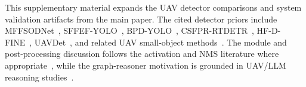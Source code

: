 % 
%
\providecommand{\FloatBarrier}{}

This supplementary material expands the UAV detector comparisons and system
validation artifacts from the main paper. The cited detector priors include
MFFSODNet~\cite{jiang2024mffsodnet}, SFFEF-YOLO~\cite{bai2025sffefyolo},
BPD-YOLO~\cite{chao2025bpdyolo}, CSFPR-RTDETR~\cite{hu2025csfprrtdetr},
HF-D-FINE~\cite{hu2026hfdifine}, UAVDet~\cite{yang2026uavdet}, and related
UAV small-object methods~\cite{han2025lrds,xie2026dgtsod,wang2026d2adetector,
chen2026ufodetr,bi2025cfia,li2026dfformer,tan2025rtuavsod}. The module and
post-processing discussion follows the activation and NMS literature
where appropriate~\cite{ma2020frelu,bodla2017softnms}, while the graph-reasoner
motivation is grounded in UAV/LLM reasoning studies~\cite{tian2025uavsmeetllms,
cai2025neusis}.





